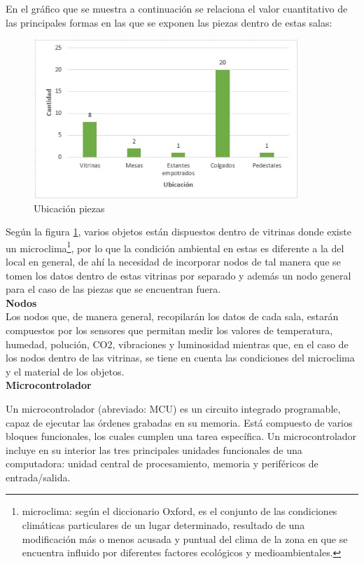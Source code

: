     En el gráfico que se muestra a continuación se relaciona el valor cuantitativo de las principales formas en las que se exponen las piezas dentro de estas salas:\newline

    \begin{figure}[h]
        \centering
        \includegraphics[width=10cm, height=6cm]{imagenes/formas expositivas.jpg}
        \caption{Ubicación piezas}
        \label{imag:ubicacion_piezas}
    \end{figure}

    Según la figura \ref{imag:ubicacion_piezas}, varios objetos están dispuestos dentro de vitrinas donde existe un microclima\footnote{microclima: según el diccionario Oxford, es el conjunto de las condiciones climáticas particulares de un lugar determinado, resultado de una modificación más o menos acusada y puntual del clima de la zona en que se encuentra influido por diferentes factores ecológicos y medioambientales.}, por lo que la condición ambiental en estas es diferente a la del local en general, de ahí la necesidad de incorporar nodos de tal manera que se tomen los datos dentro de estas vitrinas por separado y además un nodo general para el caso de las piezas que se encuentran fuera.\\

    \textbf{Nodos}\\
    Los nodos que, de manera general, recopilarán los datos de cada sala, estarán compuestos por los sensores que permitan medir los valores de temperatura, humedad, polución, CO2, vibraciones y luminosidad mientras que, en el caso de los nodos dentro de las vitrinas, se tiene en cuenta las condiciones del microclima y el material de los objetos.\\

    \textbf{Microcontrolador}

    Un microcontrolador (abreviado: MCU) es un circuito integrado programable, capaz de ejecutar las órdenes grabadas en su memoria. Está compuesto de varios bloques funcionales, los cuales cumplen una tarea específica. Un microcontrolador incluye en su interior las tres principales unidades funcionales de una computadora: unidad central de procesamiento, memoria y periféricos de entrada/salida.

